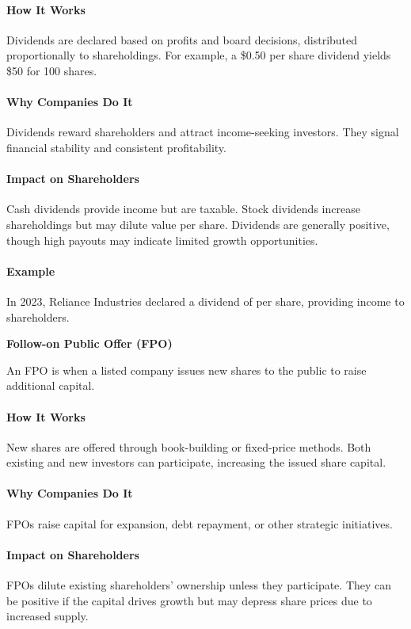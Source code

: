 \documentclass[12pt]{article}
\begin{document}
\paragraph{How It Works}
Dividends are declared based on profits and board decisions, distributed proportionally to shareholdings. For example, a \$0.50 per share dividend yields \$50 for 100 shares.

\paragraph{Why Companies Do It}
Dividends reward shareholders and attract income-seeking investors. They signal financial stability and consistent profitability.

\paragraph{Impact on Shareholders}
Cash dividends provide income but are taxable. Stock dividends increase shareholdings but may dilute value per share. Dividends are generally positive, though high payouts may indicate limited growth opportunities.

\paragraph{Example}
In 2023, Reliance Industries declared a dividend of  per share, providing income to shareholders.

\textbf{Follow-on Public Offer (FPO)}

An FPO is when a listed company issues new shares to the public to raise additional capital.

\paragraph{How It Works}
New shares are offered through book-building or fixed-price methods. Both existing and new investors can participate, increasing the issued share capital.

\paragraph{Why Companies Do It}
FPOs raise capital for expansion, debt repayment, or other strategic initiatives.

\paragraph{Impact on Shareholders}
FPOs dilute existing shareholders' ownership unless they participate. They can be positive if the capital drives growth but may depress share prices due to increased supply.
\end{document}
